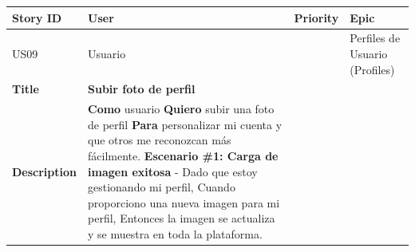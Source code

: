 {\def\LTcaptype{none} %
\begin{longtable}[]{@{}
  >{\raggedright\arraybackslash}p{}
  >{\raggedright\arraybackslash}p{}
  >{\raggedright\arraybackslash}p{}
  >{\raggedright\arraybackslash}p{}@{}}
\toprule\noalign{}
\begin{minipage}[b]{\linewidth}\raggedright
Story ID
\end{minipage} & \begin{minipage}[b]{\linewidth}\raggedright
User
\end{minipage} & \begin{minipage}[b]{\linewidth}\raggedright
Priority
\end{minipage} & \begin{minipage}[b]{\linewidth}\raggedright
Epic
\end{minipage} \\
\midrule\noalign{}
\endhead
\bottomrule\noalign{}
\endlastfoot
US09 & Usuario & 2 & Perfiles de Usuario (Profiles) \\
\textbf{Title} & \textbf{Subir foto de perfil} & & \\
\textbf{Description} & \textbf{Como} usuario \textbf{Quiero} subir una
foto de perfil \textbf{Para} personalizar mi cuenta y que otros me
reconozcan más fácilmente. \textbf{Escenario \#1: Carga de imagen
exitosa} - Dado que estoy gestionando mi perfil, Cuando proporciono una
nueva imagen para mi perfil, Entonces la imagen se actualiza y se
muestra en toda la plataforma. & & \\
\end{longtable}
}

